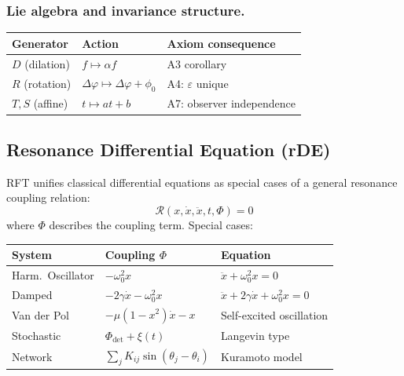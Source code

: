 \documentclass[12pt]{iopart}
\begin{document}
	\subsubsection{Lie algebra and invariance structure.}
	\begin{center}
		\begin{tabular}{lll}
			\hline
			\textbf{Generator} & \textbf{Action}
			& \textbf{Axiom consequence} \\
			\hline
			$D$ (dilation) & $f\mapsto\alpha f$ & A3 corollary \\
			$R$ (rotation) & $\Delta\varphi\mapsto\Delta\varphi+\phi_0$
			& A4: $\varepsilon$ unique \\
			$T, S$ (affine) & $t\mapsto at+b$
			& A7: observer independence \\
			\hline
		\end{tabular}
	\end{center}
	
	\subsection{Resonance Differential Equation (rDE)}
	
	RFT unifies classical differential equations as
	special cases of a general resonance coupling relation:
	\begin{equation}
		\mathcal{R}(x, \dot{x}, \ddot{x}, t, \Phi) = 0
		\label{eq:rdgl}
	\end{equation}
	where $\Phi$ describes the coupling term. Special cases:
	
	\medskip
	\begin{center}
		\begin{tabular}{lll}
			\hline
			\textbf{System} & \textbf{Coupling $\Phi$}
			& \textbf{Equation} \\
			\hline
			Harm.\ Oscillator & $-\omega_0^2 x$
			& $\ddot{x} + \omega_0^2 x = 0$ \\
			Damped & $-2\gamma\dot{x} - \omega_0^2 x$
			& $\ddot{x} + 2\gamma\dot{x} + \omega_0^2 x = 0$ \\
			Van der Pol & $-\mu(1{-}x^2)\dot{x} - x$
			& Self-excited oscillation \\
			Stochastic & $\Phi_{\det} + \xi(t)$
			& Langevin type \\
			Network & $\sum_j K_{ij}\sin(\theta_j{-}\theta_i)$
			& Kuramoto model \\
			\hline
		\end{tabular}
	\end{center}
	
\end{document}
